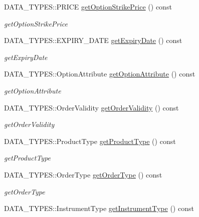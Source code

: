 \begin{DoxyCompactItemize}
D\-A\-T\-A\-\_\-\-T\-Y\-P\-E\-S\-::\-P\-R\-I\-C\-E \hyperlink{class_a_p_i2_1_1_single_order_a06316b4f9f74b63c21342f15798e4232}{get\-Option\-Strike\-Price} () const 
\begin{DoxyCompactList}\small\item\em get\-Option\-Strike\-Price \end{DoxyCompactList}\item 
D\-A\-T\-A\-\_\-\-T\-Y\-P\-E\-S\-::\-E\-X\-P\-I\-R\-Y\-\_\-\-D\-A\-T\-E \hyperlink{class_a_p_i2_1_1_single_order_a658f0353ae54bb5323a8574c3230c6ec}{get\-Expiry\-Date} () const 
\begin{DoxyCompactList}\small\item\em get\-Expiry\-Date \end{DoxyCompactList}\item 
D\-A\-T\-A\-\_\-\-T\-Y\-P\-E\-S\-::\-Option\-Attribute \hyperlink{class_a_p_i2_1_1_single_order_aa07bbb21fb434e99e0ad2315eb0f061d}{get\-Option\-Attribute} () const 
\begin{DoxyCompactList}\small\item\em get\-Option\-Attribute \end{DoxyCompactList}\item 
D\-A\-T\-A\-\_\-\-T\-Y\-P\-E\-S\-::\-Order\-Validity \hyperlink{class_a_p_i2_1_1_single_order_a256ad70ca6364e58e9570a01171f545d}{get\-Order\-Validity} () const 
\begin{DoxyCompactList}\small\item\em get\-Order\-Validity \end{DoxyCompactList}\item 
D\-A\-T\-A\-\_\-\-T\-Y\-P\-E\-S\-::\-Product\-Type \hyperlink{class_a_p_i2_1_1_single_order_ad7dd2468cb1fedab48057cd7dd98c075}{get\-Product\-Type} () const 
\begin{DoxyCompactList}\small\item\em get\-Product\-Type \end{DoxyCompactList}\item 
D\-A\-T\-A\-\_\-\-T\-Y\-P\-E\-S\-::\-Order\-Type \hyperlink{class_a_p_i2_1_1_single_order_aec0fe641e3bb0c9b866b2ad221a9edd1}{get\-Order\-Type} () const 
\begin{DoxyCompactList}\small\item\em get\-Order\-Type \end{DoxyCompactList}\item 
D\-A\-T\-A\-\_\-\-T\-Y\-P\-E\-S\-::\-Instrument\-Type \hyperlink{class_a_p_i2_1_1_single_order_afb63f5032c3ee33e1c977b3a6c3521be}{get\-Instrument\-Type} () const 

\end{DoxyCompactItemize}
